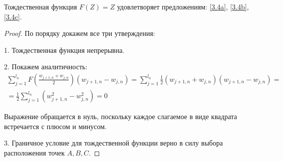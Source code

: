 \begin{lemma}\label{f=z}

Тождественная функция $F(Z) = Z$ удовлетворяет предложениям: \ref{3.4a}, \ref{3.4b}, \ref{3.4c}.

\end{lemma}



\begin{proof}
По порядку докажем все три утверждения:

1. Тождественная функция непрерывна.

2. Покажем аналитичность:
\begin{multline*}
    \sum\limits_{j=1}^{l_n} F\left(\frac{w_{j+1,n}+w_{j,n}}{2}\right) (w_{j+1,n}-w_{j,n})= \sum\limits_{j=1}^{l_n} \frac{1}{2}(w_{j+1,n}+w_{j,n}) (w_{j+1,n}-w_{j,n})= \\ =  \frac{1}{2}\sum\limits_{j=1}^{l_n} (w_{j+1,n}^2-w_{j,n}^2)  = 0
\end{multline*}

Выражение обращается в нуль, поскольку каждое слагаемое в виде квадрата встречается с плюсом и минусом.

3. Граничное условие для тождественной функции верно в силу выбора расположения точек $A, B, C$. 
\end{proof}
